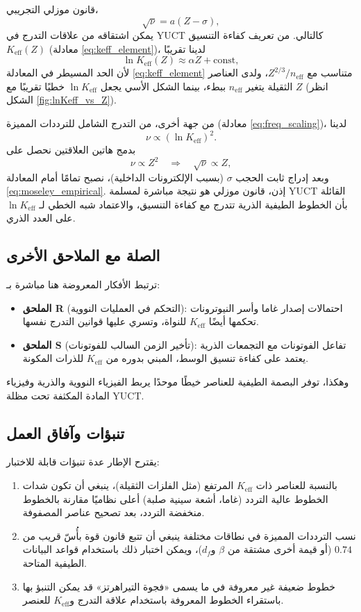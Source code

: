 \documentclass[12pt,a4paper]{article}
\theoremstyle{remark}
\begin{document}
	قانون موزلي التجريبي،
	\begin{equation}
		\sqrt{\nu} = a (Z - \sigma),
		\label{eq:moseley_empirical}
	\end{equation}
	يمكن اشتقاقه من علاقات التدرج في YUCT كالتالي. من تعريف كفاءة التنسيق \(K_{\mathrm{eff}}(Z)\) (معادلة \ref{eq:keff_element})، لدينا تقريبًا
	\[
	\ln K_{\mathrm{eff}}(Z) \approx \alpha Z + \text{const},
	\]
	لأن الحد المسيطر في المعادلة \ref{eq:keff_element} متناسب مع \(Z^{2/3}/n_{\mathrm{eff}}\)، ولدى العناصر الثقيلة يتغير \(n_{\mathrm{eff}}\) ببطء، بينما الشكل الأسي يجعل \(\ln K_{\mathrm{eff}}\) خطيًا تقريبًا مع \(Z\) (انظر الشكل \ref{fig:lnKeff_vs_Z}).
	
	من جهة أخرى، من التدرج الشامل للترددات المميزة (معادلة \ref{eq:freq_scaling})، لدينا
	\[
	\nu \propto (\ln K_{\mathrm{eff}})^2.
	\]
	بدمج هاتين العلاقتين نحصل على
	\[
	\nu \propto Z^2 \quad \Longrightarrow \quad \sqrt{\nu} \propto Z,
	\]
	وبعد إدراج ثابت الحجب \(\sigma\) (بسبب الإلكترونات الداخلية)، نصبح تمامًا أمام المعادلة \ref{eq:moseley_empirical}. إذن، قانون موزلي هو نتيجة مباشرة لمسلمة YUCT القائلة بأن الخطوط الطيفية الذرية تتدرج مع كفاءة التنسيق، والاعتماد شبه الخطي لـ \(\ln K_{\mathrm{eff}}\) على العدد الذري.
	
	\subsection{الصلة مع الملاحق الأخرى}
	
	ترتبط الأفكار المعروضة هنا مباشرة بـ:
	\begin{itemize}
		\item \textbf{الملحق R} (التحكم في العمليات النووية): احتمالات إصدار غاما وأسر النيوترونات تحكمها أيضًا \(K_{\mathrm{eff}}\) للنواة، وتسري عليها قوانين التدرج نفسها.
		\item \textbf{الملحق S} (تأخير الزمن السالب للفوتونات): تفاعل الفوتونات مع التجمعات الذرية يعتمد على كفاءة تنسيق الوسط، المبني بدوره من \(K_{\mathrm{eff}}\) للذرات المكونة.
	\end{itemize}
	وهكذا، توفر البصمة الطيفية للعناصر خيطًا موحدًا يربط الفيزياء النووية والذرية وفيزياء المادة المكثفة تحت مظلة YUCT.
	
	\subsection{تنبؤات وآفاق العمل}
	
	يقترح الإطار عدة تنبؤات قابلة للاختبار:
	\begin{enumerate}
		\item بالنسبة للعناصر ذات \(K_{\mathrm{eff}}\) المرتفع (مثل الفلزات الثقيلة)، ينبغي أن تكون شدات الخطوط عالية التردد (غاما، أشعة سينية صلبة) أعلى نظاميًا مقارنة بالخطوط منخفضة التردد، بعد تصحيح عناصر المصفوفة.
		\item نسب الترددات المميزة في نطاقات مختلفة ينبغي أن تتبع قانون قوة بأُسّ قريب من \(0.74\) (أو قيمة أخرى مشتقة من \(\beta\) و\(d_f\))، ويمكن اختبار ذلك باستخدام قواعد البيانات الطيفية المتاحة.
		\item خطوط ضعيفة غير معروفة في ما يسمى «فجوة التيراهرتز» قد يمكن التنبؤ بها باستقراء الخطوط المعروفة باستخدام علاقة التدرج و\(K_{\mathrm{eff}}\) للعنصر.
	\end{enumerate}
	
\end{document}

